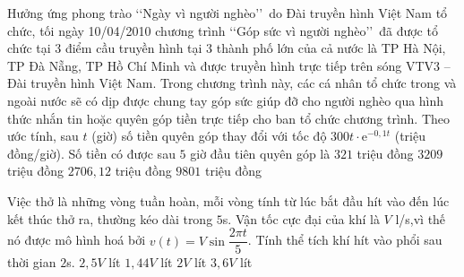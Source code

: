 \begin{ex}%
	Hưởng ứng phong trào \lq\lq Ngày vì người nghèo\rq\rq\, do Đài truyền hình Việt Nam tổ chức, tối ngày 10/04/2010 chương trình  \lq\lq Góp sức vì người nghèo\rq\rq\, đã được tổ chức tại $3$ điểm cầu truyền hình tại $3$ thành phố lớn của cả nước là TP Hà Nội, TP Đà Nẵng, TP Hồ Chí Minh và được truyền hình trực tiếp trên sóng VTV3 – Đài truyền hình Việt Nam. Trong chương trình này, các cá nhân tổ chức trong và ngoài nước sẽ có dịp được chung tay góp sức giúp đỡ cho người nghèo qua hình thức nhắn tin hoặc quyên góp tiền trực tiếp cho ban tổ chức chương trình. Theo ước tính, sau $t$ (giờ) số tiền quyên góp thay đổi với tốc độ $300 t\cdot\mathrm{e}^{-0{,}1t}$ (triệu đồng/giờ). Số tiền có được sau $5$ giờ đầu tiên quyên góp là 
	\choice
	{$321$ triệu đồng}
	{$3209$ triệu đồng}
	{\True $2706{,}12$ triệu đồng}
	{$9801$ triệu đồng}
\end{ex}

\begin{ex}%
	Việc thở là những vòng tuần hoàn, mỗi vòng tính từ lúc bắt đầu hít vào đến lúc kết thúc thở ra, thường kéo dài trong $5$s. Vận tốc cực đại của khí là $V$ l/s,vì thế nó được mô hình hoá bởi $v(t)=V\sin \dfrac{2\pi t}{5}$. Tính thể tích khí hít vào phổi sau thời gian $2$s. 
	\choice
	{$2{,}5V$ lít}
	{\True $1{,}44V$ lít}
	{$2V$ lít}
	{$3{,}6V$ lít}
\end{ex}

